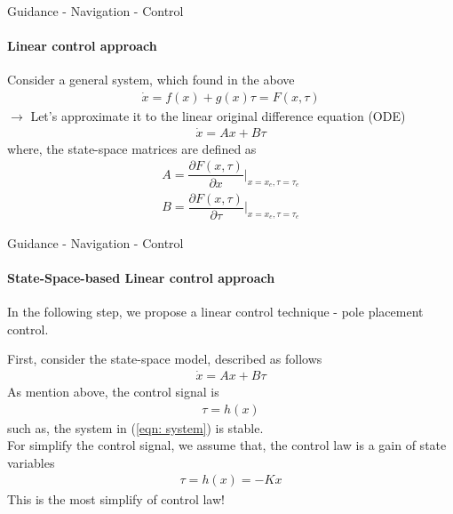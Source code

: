 \begin{frame}{Guidance - Navigation - Control}
	\framesubtitle{Linear control approach}
	Consider a general system, which found in the above
	\begin{align}
		\Dot{{x}} = f({x}) + g({x})\tau = F({x}, \tau)
	\end{align}
	$\to$ Let's approximate it to the linear original difference equation (ODE)
	\begin{align}
		\Dot{{x}} = {A}{x} + {B}\tau
	\end{align}
	where, the state-space matrices are defined as
	\begin{align}
		{A} = \dfrac{\partial F({x}, \tau)}{\partial {x}}\Bigg|_{{x} = {x}_e,\tau = \tau_e} \\
		{B} = \dfrac{\partial F({x}, \tau)}{\partial \tau}\Bigg|_{{x} = {x}_e, \tau = \tau_e}
	\end{align}
\end{frame}






\begin{frame}{Guidance - Navigation - Control}
	\framesubtitle{State-Space-based Linear control approach}
	{\color{red} In the following step, we propose a linear control technique - pole placement control.}
	
	\vspace{0.5cm}
	
	First, consider the state-space model, described as follows
	\begin{align}
		\Dot{{x}} = {A}{x} + {B}\tau \label{eqn: system}
	\end{align}
	As mention above, the control signal is 
	\begin{align}
		\tau = h({x})
	\end{align}
	such as, the system in (\ref{eqn: system}) is stable.\\ 
	For simplify the control signal, we assume that, the control law is a gain of state variables
	\begin{align}
		\tau = h({x}) = -{K}{x}
	\end{align}
	{\color{red} This is the most simplify of control law!}
\end{frame}






